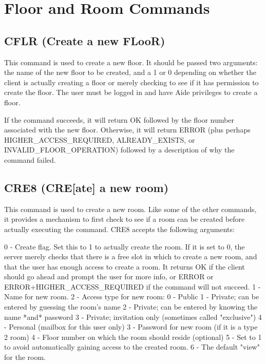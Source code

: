 \section{Floor and Room Commands}



\subsection{CFLR (Create a new FLooR)}

 This command is used to create a new floor.  It should be passed two
arguments: the name of the new floor to be created, and a 1 or 0 depending
on whether the client is actually creating a floor or merely checking to
see if it has permission to create the floor.   The user must be logged in
and have Aide privileges to create a floor.

 If the command succeeds, it will return OK followed by the floor number
associated with the new floor.  Otherwise, it will return ERROR (plus perhaps
HIGHER_ACCESS_REQUIRED, ALREADY_EXISTS, or INVALID_FLOOR_OPERATION)
followed by a description of why the command failed.



\subsection{CRE8 (CRE[ate] a new room)}

 This command is used to create a new room.  Like some of the other
commands, it provides a mechanism to first check to see if a room can be
created before actually executing the command.  CRE8 accepts the following
arguments:

 0  -  Create flag.  Set this to 1 to actually create the room.  If it is
set to 0, the server merely checks that there is a free slot in which to
create a new room, and that the user has enough access to create a room.  It
returns OK if the client should go ahead and prompt the user for more info,
or ERROR or ERROR+HIGHER_ACCESS_REQUIRED if the command will not succeed.
 1  -  Name for new room.
 2  -  Access type for new room:
       0  -  Public
       1  -  Private; can be entered by guessing the room's name
       2  -  Private; can be entered by knowing the name *and* password
       3  -  Private; invitation only (sometimes called "exclusive")
       4  -  Personal (mailbox for this user only)
 3  -  Password for new room (if it is a type 2 room)
 4  -  Floor number on which the room should reside (optional)
 5  -  Set to 1 to avoid automatically gaining access to the created room.
 6  -  The default "view" for the room.

